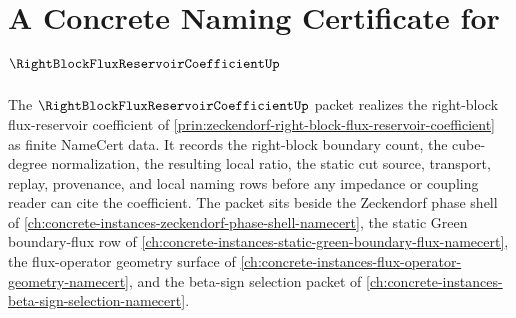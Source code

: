 \chapter{A Concrete Naming Certificate for $\RightBlockFluxReservoirCoefficientUp$}
\label{ch:concrete-instances-right-block-flux-reservoir-coefficient-namecert}

The $\RightBlockFluxReservoirCoefficientUp$ packet realizes the right-block flux-reservoir coefficient of \autoref{prin:zeckendorf-right-block-flux-reservoir-coefficient} as finite NameCert data. It records the right-block boundary count, the cube-degree normalization, the resulting local ratio, the static cut source, transport, replay, provenance, and local naming rows before any impedance or coupling reader can cite the coefficient. The packet sits beside the Zeckendorf phase shell of \autoref{ch:concrete-instances-zeckendorf-phase-shell-namecert}, the static Green boundary-flux row of \autoref{ch:concrete-instances-static-green-boundary-flux-namecert}, the flux-operator geometry surface of \autoref{ch:concrete-instances-flux-operator-geometry-namecert}, and the beta-sign selection packet of \autoref{ch:concrete-instances-beta-sign-selection-namecert}.


